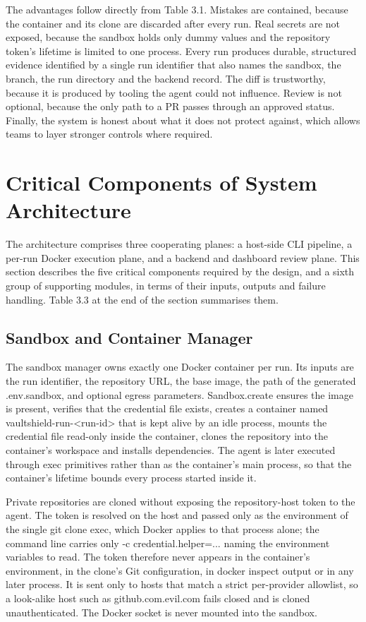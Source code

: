 \documentclass[12pt,a4paper,oneside]{report}
\begin{document}
The advantages follow directly from Table 3.1. Mistakes are contained, because the container and its clone are discarded after every run. Real secrets are not exposed, because the sandbox holds only dummy values and the repository token's lifetime is limited to one process. Every run produces durable, structured evidence identified by a single run identifier that also names the sandbox, the branch, the run directory and the backend record. The diff is trustworthy, because it is produced by tooling the agent could not influence. Review is not optional, because the only path to a PR passes through an approved status. Finally, the system is honest about what it does not protect against, which allows teams to layer stronger controls where required.

\section{Critical Components of System Architecture}\label{critical-components-of-system-architecture}

The architecture comprises three cooperating planes: a host-side CLI pipeline, a per-run Docker execution plane, and a backend and dashboard review plane. This section describes the five critical components required by the design, and a sixth group of supporting modules, in terms of their inputs, outputs and failure handling. Table 3.3 at the end of the section summarises them.

\subsection{Sandbox and Container Manager}\label{sandbox-and-container-manager}

The sandbox manager owns exactly one Docker container per run. Its inputs are the run identifier, the repository URL, the base image, the path of the generated .env.sandbox, and optional egress parameters. Sandbox.create ensures the image is present, verifies that the credential file exists, creates a container named vaultshield-run-<run-id> that is kept alive by an idle process, mounts the credential file read-only inside the container, clones the repository into the container's workspace and installs dependencies. The agent is later executed through exec primitives rather than as the container's main process, so that the container's lifetime bounds every process started inside it.

Private repositories are cloned without exposing the repository-host token to the agent. The token is resolved on the host and passed only as the environment of the single git clone exec, which Docker applies to that process alone; the command line carries only -c credential.helper=... naming the environment variables to read. The token therefore never appears in the container's environment, in the clone's Git configuration, in docker inspect output or in any later process. It is sent only to hosts that match a strict per-provider allowlist, so a look-alike host such as github.com.evil.com fails closed and is cloned unauthenticated. The Docker socket is never mounted into the sandbox.
\end{document}
